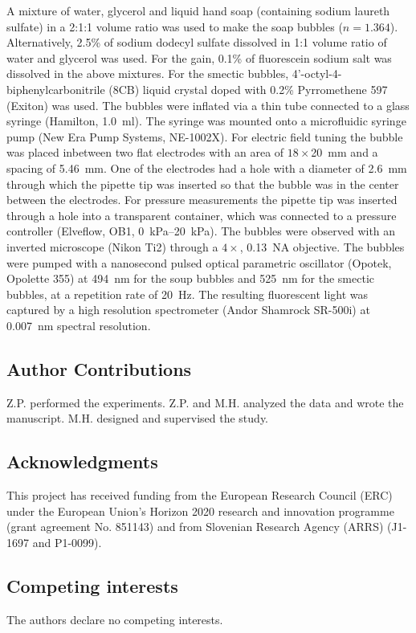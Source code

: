 \documentclass[a4paper,12pt]{article}
\begin{document}
	A mixture of water, glycerol and liquid hand soap (containing sodium laureth sulfate) in a 2:1:1 volume ratio was used to make the soap bubbles ($n=1.364$). Alternatively, 2.5\% of sodium dodecyl sulfate dissolved in 1:1 volume ratio of water and glycerol was used. For the gain, 0.1\% of fluorescein sodium salt was dissolved in the above mixtures. For the smectic bubbles, 4'-octyl-4-biphenylcarbonitrile (8CB) liquid crystal doped with 0.2\% Pyrromethene 597 (Exiton) was used. The bubbles were inflated via a thin tube connected to a glass syringe (Hamilton, \SI{1.0}{ml}). The syringe was mounted onto a microfluidic syringe pump (New Era Pump Systems, NE-1002X). For electric field tuning the bubble was placed inbetween two flat electrodes with an area of $18 \times$\SI{20}{mm} and a spacing of \SI{5.46}{mm}. One of the electrodes had a hole with a diameter of \SI{2.6}{mm} through which the pipette tip was inserted so that the bubble was in the center between the electrodes. For pressure measurements the pipette tip was inserted through a hole into a transparent container, which was connected to a pressure controller (Elveflow, OB1, \SIrange{0}{20}{kPa}). The bubbles were observed with an inverted microscope (Nikon Ti2) through a $4\times$, \SI{0.13}{NA} objective. The bubbles were pumped with a nanosecond pulsed optical parametric oscillator (Opotek, Opolette 355) at \SI{494}{nm} for the soup bubbles and \SI{525}{nm} for the smectic bubbles, at a repetition rate of \SI{20}{Hz}. The resulting fluorescent light was captured by a high resolution spectrometer (Andor Shamrock SR-500i) at \SI{0.007}{nm} spectral resolution.
	
	
	\subsection*{Author Contributions}
	Z.P. performed the experiments. Z.P. and M.H. analyzed the data and wrote the manuscript. M.H. designed and supervised the study.
	
	\subsection*{Acknowledgments}
	This project has received funding from the European Research Council (ERC) under the European Union’s Horizon 2020 research and innovation programme (grant agreement No. 851143) and from Slovenian Research Agency (ARRS) (J1-1697 and P1-0099).
	
	\subsection*{Competing interests}
	The authors declare no competing interests.
	
\end{document}
